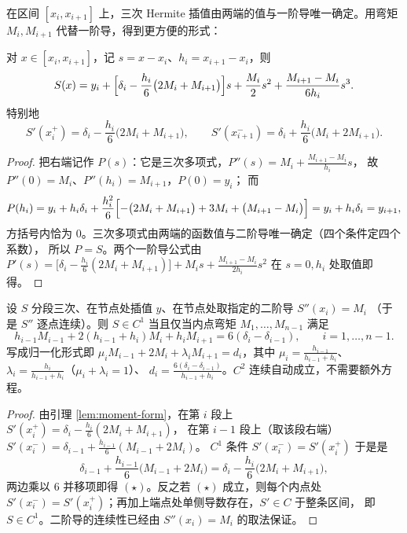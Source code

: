 在区间 $[x_i,x_{i+1}]$ 上，三次 Hermite 插值由两端的值与一阶导唯一确定。用弯矩
$M_i,M_{i+1}$ 代替一阶导，得到更方便的形式：

\begin{lemma}[弯矩形式的段内表达式]
\label{lem:moment-form}
对 $x\in[x_i,x_{i+1}]$，记 $s=x-x_i$、$h_i=x_{i+1}-x_i$，则
\[
S(x)=y_i+\Bigl[\delta_i-\frac{h_i}{6}\bigl(2M_i+M_{i+1}\bigr)\Bigr]s
+\frac{M_i}{2}s^2+\frac{M_{i+1}-M_i}{6h_i}s^3 .
\]
特别地
\[
S'(x_i^+)=\delta_i-\frac{h_i}{6}\bigl(2M_i+M_{i+1}\bigr),\qquad
S'(x_{i+1}^-)=\delta_i+\frac{h_i}{6}\bigl(M_i+2M_{i+1}\bigr).
\]
\end{lemma}

\begin{proof}
把右端记作 $P(s)$：它是三次多项式，$P''(s)=M_i+\frac{M_{i+1}-M_i}{h_i}s$，
故 $P''(0)=M_i$、$P''(h_i)=M_{i+1}$，$P(0)=y_i$；
而
\[
P(h_i)=y_i+h_i\delta_i+\frac{h_i^2}{6}\Bigl[-\bigl(2M_i+M_{i+1}\bigr)+3M_i+\bigl(M_{i+1}-M_i\bigr)\Bigr]
=y_i+h_i\delta_i=y_{i+1},
\]
方括号内恰为 $0$。三次多项式由两端的函数值与二阶导唯一确定（四个条件定四个系数），
所以 $P=S$。两个一阶导公式由 $P'(s)=\bigl[\delta_i-\frac{h_i}{6}(2M_i+M_{i+1})\bigr]
+M_is+\frac{M_{i+1}-M_i}{2h_i}s^2$ 在 $s=0,h_i$ 处取值即得。
\end{proof}

\begin{theorem}
\label{thm:tridiag}
设 $S$ 分段三次、在节点处插值 $y$、在节点处取指定的二阶导 $S''(x_i)=M_i$
（于是 $S''$ 逐点连续）。则 $S\in C^1$ 当且仅当内点弯矩 $M_1,\dots,M_{n-1}$ 满足
\[
h_{i-1}M_{i-1}+2(h_{i-1}+h_i)M_i+h_iM_{i+1}=6(\delta_i-\delta_{i-1}),
\qquad i=1,\dots,n-1 .
\tag{$\star$}
\]
写成归一化形式即 $\mu_iM_{i-1}+2M_i+\lambda_iM_{i+1}=d_i$，其中
$\mu_i=\frac{h_{i-1}}{h_{i-1}+h_i}$、$\lambda_i=\frac{h_i}{h_{i-1}+h_i}$（$\mu_i+\lambda_i=1$）、
$d_i=\frac{6(\delta_i-\delta_{i-1})}{h_{i-1}+h_i}$。$C^2$ 连续自动成立，不需要额外方程。
\end{theorem}

\begin{proof}
由引理 \ref{lem:moment-form}，在第 $i$ 段上
$S'(x_i^+)=\delta_i-\frac{h_i}{6}(2M_i+M_{i+1})$，
在第 $i-1$ 段上（取该段右端）
$S'(x_i^-)=\delta_{i-1}+\frac{h_{i-1}}{6}(M_{i-1}+2M_i)$。
$C^1$ 条件 $S'(x_i^-)=S'(x_i^+)$ 于是是
\[
\delta_{i-1}+\frac{h_{i-1}}{6}\bigl(M_{i-1}+2M_i\bigr)
=\delta_i-\frac{h_i}{6}\bigl(2M_i+M_{i+1}\bigr),
\]
两边乘以 $6$ 并移项即得 $(\star)$。反之若 $(\star)$ 成立，则每个内点处
$S'(x_i^-)=S'(x_i^+)$；再加上端点处单侧导数存在，$S'\in C$ 于整条区间，
即 $S\in C^1$。二阶导的连续性已经由 $S''(x_i)=M_i$ 的取法保证。
\end{proof}

